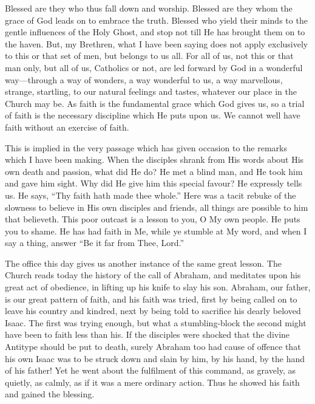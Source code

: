 Blessed are they who thus fall down and worship.
Blessed are they whom the grace of God leads on to embrace the
truth. Blessed who yield their minds to the gentle influences of the
Holy Ghost, and stop not till He has brought them on to the haven.
But, my Brethren, what I have been saying does not apply exclusively
to this or that set of men, but belongs to us all. For all of us, not
this or that man only, but all of us, Catholics or not, are led
forward by God in a wonderful way—through a way of wonders, a way
wonderful to us, a way marvellous, strange, startling, to our natural
feelings and tastes, whatever our place in the Church may be. As faith
is the fundamental grace which God gives us, so a trial of faith is
the necessary discipline which He puts upon us. We cannot well have
faith without an exercise of faith.

This is implied in the very passage which has
given occasion to the remarks which I have been making. When the
disciples shrank from His words about His own death and passion, what
did He do? He met a blind man, and He took him and gave him sight. Why
did He give him this special favour? He expressly tells us. He says, ``Thy
faith hath made thee whole.'' Here was a tacit rebuke of the slowness
to believe in His own disciples and friends, all things are possible
to him that believeth. This poor outcast is a lesson to you, O My own
people. He puts you to shame. He has had faith in Me, while ye stumble
at My word, and when I say a thing, answer ``Be it far from Thee,
Lord.''

The office this day gives us another instance of
the same great lesson. The Church reads today the history of the
call of Abraham, and meditates upon his great act of obedience, in
lifting up his knife to slay his son. Abraham, our father, is our
great pattern of faith, and his faith was tried, first by being called
on to leave his country and kindred, next by being told to sacrifice
his dearly beloved Isaac. The first was trying enough, but what a
stumbling-block the second might have been to faith less than his. If
the disciples were shocked that the divine Antitype should be put to
death, surely Abraham too had cause of offence that his own Isaac was
to be struck down and slain by him, by his hand, by the hand of his
father! Yet he went about the fulfilment of this command, as gravely,
as quietly, as calmly, as if it was a mere ordinary action. Thus he
showed his faith and gained the blessing.

